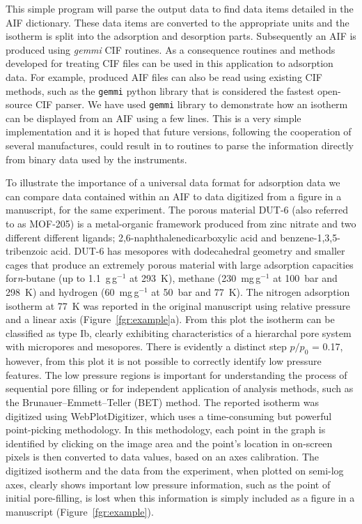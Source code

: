 \documentclass[journal=langd5,manuscript=article]{achemso}
\begin{document}
This simple program will parse the output data to find data items detailed in the AIF dictionary.
These data items are converted to the appropriate units and the isotherm is split into the adsorption and desorption parts.
Subsequently an AIF is produced using \textit{gemmi} CIF routines.\cite{gemmi}
As a consequence routines and methods developed for treating CIF files can be used in this application to adsorption data.
For example, produced AIF files can also be read using existing CIF methods, such as the \texttt{gemmi} python library that is considered the fastest open-source CIF parser.\cite{gemmi}
We have used \texttt{gemmi} library to demonstrate how an isotherm can be displayed from an AIF using a few lines.
This is a very simple implementation and it is hoped that future versions, following the cooperation of several manufactures, could result in to routines to parse the information directly from binary data used by the instruments.

To illustrate the importance of a universal data format for adsorption data we can compare data contained within an AIF to data digitized from a figure in a manuscript, for the same experiment.
The porous material DUT-6 (also referred to as MOF-205) is a metal-organic framework produced from zinc nitrate and two different different ligands; 2,6-naphthalenedicarboxylic acid and benzene-1,3,5-tribenzoic acid.\cite{10.1002/anie.200904599}
DUT-6 has mesopores with dodecahedral geometry and smaller cages that produce an extremely porous material with large adsorption capacities for\textit{n}-butane (up to 1.1~g$\,$g$^{-1}$ at 293~K),  methane (230~mg$\,$g$^{-1}$ at 100~bar and 298~K) and hydrogen (60~mg$\,$g$^{-1}$ at 50~bar and 77~K).
The nitrogen adsorption isotherm at 77~K was reported in the original manuscript using relative pressure and a linear axis (Figure~\ref{fgr:example}a).
From this plot the isotherm can be classified  as  type  Ib, clearly exhibiting characteristics of a hierarchal pore system with micropores and mesopores.
There is evidently a distinct step $p/p_0$ = 0.17, however, from this plot it is not possible to correctly identify low pressure features.
The low pressure regions is important for understanding the process of sequential pore filling or for independent application of analysis methods, such as the Brunauer–Emmett–Teller (BET) method.\cite{10.1016/S0167-2991(07)80008-5}
The reported isotherm was digitized using WebPlotDigitizer, which uses a time-consuming but powerful point-picking methodology.\cite{webplotdigitizer}
In this methodology, each point in the graph is identified by clicking on the image area and the point's location in on-screen pixels is then converted to data values, based on an axes calibration.
The digitized isotherm and the data from the experiment, when plotted on semi-log axes, clearly shows important low pressure information, such as the point of initial pore-filling, is lost when this information is simply included as a figure in a manuscript (Figure~\ref{fgr:example}).
\end{document}
